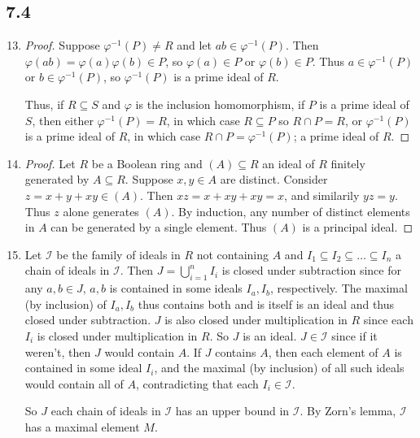\documentclass[11pt, letterpaper]{article}
\begin{document}
\subsection*{7.4}

\begin{enumerate}
  \setcounter{enumi}{12}
  \item \begin{enumerate}
    \begin{proof}
      Suppose $\varphi^{-1}(P) \neq R$ and let $ab \in \varphi^{-1}(P)$. Then $\varphi(ab) = \varphi(a)\varphi(b) \in P$, so $\varphi(a) \in P$ or $\varphi(b) \in P$. Thus $a \in \varphi^{-1}(P)$ or $b \in \varphi^{-1}(P)$, so $\varphi^{-1}(P)$ is a prime ideal of $R$.

      Thus, if $R \subseteq S$ and $\varphi$ is the inclusion homomorphism, if $P$ is a prime ideal of $S$, then either $\varphi^{-1}(P) = R$, in which case $R \subseteq P$ so $R \cap P = R$, or $\varphi^{-1}(P)$ is a prime ideal of $R$, in which case $R \cap P = \varphi^{-1}(P)$; a prime ideal of $R$.
    \end{proof}
  \end{enumerate}

  \setcounter{enumi}{23}
  \item \begin{enumerate}
    \begin{proof}
      Let $R$ be a Boolean ring and $(A) \subseteq R$ an ideal of $R$ finitely generated by $A \subseteq R$. Suppose $x, y \in A$ are distinct. Consider $z = x + y + xy \in (A)$. Then $xz = x + xy + xy = x$, and similarily $yz = y$. Thus $z$ alone generates $(A)$. By induction, any number of distinct elements in $A$ can be generated by a single element. Thus $(A)$ is a principal ideal.
    \end{proof}
  \end{enumerate}

  \setcounter{enumi}{34}
  \item \begin{enumerate}
    Let $\mathcal I$ be the family of ideals in $R$ not containing $A$ and $I_1 \subseteq I_2 \subseteq \dots \subseteq I_n$ a chain of ideals in $\mathcal I$. Then $J = \bigcup_{i = 1}^n I_i$ is closed under subtraction since for any $a, b \in J$, $a, b$ is contained in some ideals $I_a, I_b$, respectively. The maximal (by inclusion) of $I_a, I_b$ thus contains both and is itself is an ideal and thus closed under subtraction. $J$ is also closed under multiplication in $R$ since each $I_i$ is closed under multiplication in $R$. So $J$ is an ideal. $J \in \mathcal I$ since if it weren't, then $J$ would contain $A$. If $J$ contains $A$, then each element of $A$ is contained in some ideal $I_i$, and the maximal (by inclusion) of all such ideals would contain all of $A$, contradicting that each $I_i \in \mathcal I$.

    So $J$ each chain of ideals in $\mathcal I$ has an upper bound in $\mathcal I$. By Zorn's lemma, $\mathcal I$ has a maximal element $M$.
  \end{enumerate}

  
\end{enumerate}
\end{document}
